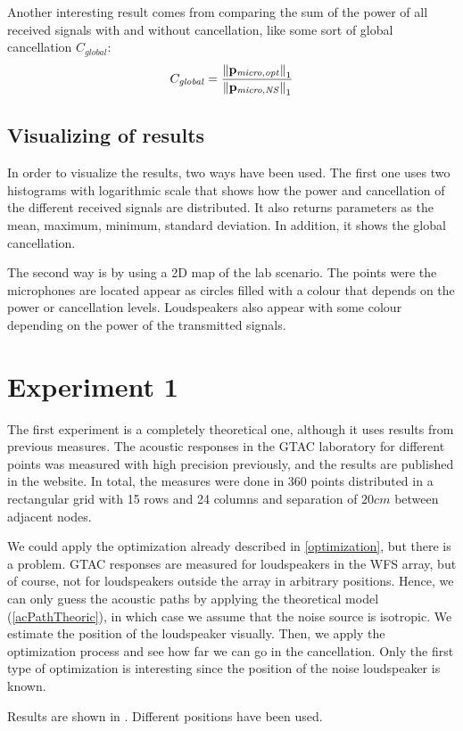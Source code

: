 Another interesting result comes from comparing the sum of the power of all received signals with and without cancellation, like some sort of global cancellation $C_\mathit{global}$:
\begin{equation}
C_\mathit{global} = \frac{\left\| \mathbf{p_\mathit{micro,opt}} \right\|_1}{\left\| \mathbf{p_\mathit{micro,NS}} \right\|_1}
\end{equation}

\subsection{Visualizing of results}
In order to visualize the results, two ways have been used. The first one uses two histograms with logarithmic scale that shows how the power and cancellation of the different received signals are distributed. It also returns parameters as the mean, maximum, minimum, standard deviation. In addition, it shows the global cancellation.

The second way is by using a 2D map of the lab scenario. The points were the microphones are located appear as circles filled with a colour that depends on the power or cancellation levels. Loudspeakers also appear with some colour depending on the power of the transmitted signals.

\section{Experiment 1}
The first experiment is a completely theoretical one, although it uses results from previous measures. The acoustic responses in the GTAC laboratory for different points was measured with high precision previously, and the results are published in the website. In total, the measures were done in 360 points distributed in a rectangular grid with 15 rows and 24 columns and separation of $20 \si{cm}$ between adjacent nodes.

We could apply the optimization already described in \autoref{optimization}, but there is a problem. GTAC responses are measured for loudspeakers in the WFS array, but of course, not for loudspeakers outside the array in arbitrary positions. Hence, we can only guess the acoustic paths by applying the theoretical model (\autoref{acPathTheoric}), in which case we assume that the noise source is isotropic. We estimate the position of the loudspeaker visually. Then, we apply the optimization process and see how far we can go in the cancellation. Only the first type of optimization is interesting since the position of the noise loudspeaker is known.

Results are shown in . Different positions have been used.






